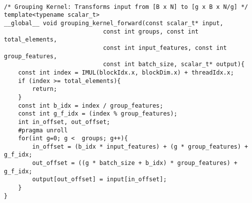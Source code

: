 \lstset{language=C++}
\begin{minipage}{\columnwidth}
\begin{lstlisting}[caption="Grouping kernel in CUDA", label={lst:group_kernel}]

/* Grouping Kernel: Transforms input from [B x N] to [g x B x N/g] */
template<typename scalar_t>
__global__ void grouping_kernel_forward(const scalar_t* input,
                            const int groups, const int total_elements,
                            const int input_features, const int group_features,
                            const int batch_size, scalar_t* output){
    const int index = IMUL(blockIdx.x, blockDim.x) + threadIdx.x;
    if (index >= total_elements){
        return;
    }
    const int b_idx = index / group_features;
    const int g_f_idx = (index % group_features);
    int in_offset, out_offset;
    #pragma unroll
    for(int g=0; g <  groups; g++){
        in_offset = (b_idx * input_features) + (g * group_features) + g_f_idx;
        out_offset = ((g * batch_size + b_idx) * group_features) + g_f_idx;
        output[out_offset] = input[in_offset];
    }
}
\end{lstlisting}
\end{minipage}


